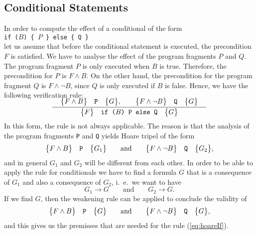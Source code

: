 \subsection{Conditional Statements}
In order to compute the effect of a conditional of the form
\\[0.2cm]
\hspace*{1.3cm}
\texttt{if ($B$) \{ $P$ \} else \{  Q \}}
\\[0.2cm]
let us assume that before the conditional statement is executed, the
precondition $F$ is satisfied.   We have to analyse the effect of the program fragments $P$ and $Q$.
The program fragment $P$ is only executed when $B$ is true.  Therefore, the precondition for $P$ is 
$F \wedge B$.  On the other hand, the precondition for the program fragment $Q$ is $F \wedge \neg B$,
since $Q$ is only executed if $B$ is false.
Hence, we have the following verification rule:
\begin{equation}
  \label{eq:hoareIf}
  \bruch{\quad\hoare{F \wedge B}{P}{G}, \qquad \hoare{F \wedge \neg B}{Q}{G}\quad}{
              \hoare{F}{if ($B$) P else Q}{G}}  
\end{equation}
In this form, the rule is not always applicable.  The reason is that the analysis of the program
fragments \texttt{P} and \texttt{Q} yields Hoare tripel of the form
\begin{equation}
  \label{eq:hoareI}
 \bigl\{F \wedge B\bigr\}\quad\texttt{P}\quad\bigl\{G_1\bigr\} \qquad \mathrm{and} \qquad \bigl\{F \wedge \neg B\bigr\}\quad\texttt{Q}\quad\bigl\{G_2\bigr\},   
\end{equation}
and in general $G_1$ and $G_2$ will be different from each other.  In order to be able to apply the
rule for conditionals we have to find a formula $G$ that is a consequence of $G_1$ and also a
consequence of $G_2$, i.~e.~we want to have
\[ G_1 \rightarrow G \qquad \mathrm{and} \qquad G_2 \rightarrow G. \]
If we find $G$, then the weakening rule  can be applied to conclude the validity of
\[ \bigl\{F \wedge B\bigr\}\quad\texttt{P}\quad\bigl\{G\bigr\} \qquad \mathrm{and} \qquad \bigl\{F \wedge \neg B\bigr\}\quad\texttt{Q}\quad\bigl\{G\bigr\},    \] 
and this gives us the premisses that are needed for the rule
(\ref{eq:hoareIf}).

